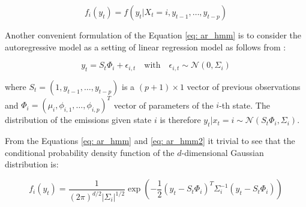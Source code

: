 \begin{equation}
    f_i(y_t) = f\left(y_t|X_t=i, y_{t-1}, \ldots, y_{t-p}\right)
\end{equation}

Another convenient formulation of the Equation \ref{eq: ar_hmm} is to consider the autoregressive model as a setting of linear regression model as follows from \citep{Xuan2004}:

\begin{equation} \label{eq: ar_hmm2}
    y_t = S_{t} \Phi_{i} + \epsilon_{i,t} \quad \text{with} \quad \epsilon_{i,t} \sim \mathcal{N}(0,\Sigma_{i})
\end{equation}

where $S_{t} = (1, y_{t-1},\ldots,y_{t-p})$ is a $(p+1) \times 1$ vector of previous observations and $\Phi_{i} = (\mu_{i},\phi_{i,1},\ldots,\phi_{i,p})^T$ 
vector of parameters of the $i$-th state. The distribution of the emissions given state $i$ is therefore $y_t|x_t=i \sim \mathcal{N}\left(S_{t} \Phi_{i}, \Sigma_i \right)$.

From the Equations \ref{eq: ar_hmm} and \ref{eq: ar_hmm2} it trivial to see that the conditional probability density function of the $d$-dimensional Gaussian distribution is:

\begin{equation}
    f_i(y_t) = \frac{1}{{(2\pi)}^{d/2}|\Sigma_i|^{1/2}} \exp\left(-\frac{1}{2}{(y_t-S_{t} \Phi_{i})}^T\Sigma^{-1}_i(y_t-S_{t} \Phi_{i})\right)
\end{equation}

